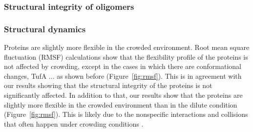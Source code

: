 \documentclass[journal=jacsat,manuscript=article]{achemso}
\begin{document}

\subsubsection{Structural integrity of oligomers}













\subsubsection{Structural dynamics}
Proteins are slightly more flexible in the crowded environment. Root mean square fluctuation (RMSF) calculations show that the flexibility profile of the proteins is not affected by crowding, except in the cases in which there are conformational changes, TufA ... as shown before (Figure~\ref{fig:rmsf}). This is in agreement with our results showing that the structural integrity of the proteins is not significantly affected. In addition to that, our results show that the proteins are slightly more flexible in the crowded environment than in the dilute condition (Figure~\ref{fig:rmsf}). This is likely due to the nonspecific interactions and collisions that often happen under crowding conditions \textbf{\color{red}{REF}}.
\end{document}
